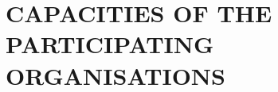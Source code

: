 \section{CAPACITIES OF THE PARTICIPATING ORGANISATIONS}
\label{sec:capacities}

\vspace{\baselineskip}


